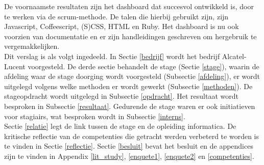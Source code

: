 \documentclass[10pt,a4paper]{article}
\begin{document}
De voornaamste resultaten zijn het dashboard dat succesvol ontwikkeld is, door te werken via de scrum-methode. De talen die hierbij gebruikt zijn, zijn Javascript, Coffeescript, (S)CSS, HTML en Ruby. Het dashboard is nu ook voorzien van documentatie en er zijn handleidingen geschreven om hergebruik te vergemakkelijken.\\

Dit verslag is als volgt ingedeeld. In Sectie \ref{bedrijf} wordt het bedrijf Alcatel-Lucent voorgesteld. De derde sectie behandelt de stage (Sectie \ref{stage}), waarin de afdeling waar de stage doorging wordt voorgesteld (Subsectie \ref{afdeling}), er wordt uitgelegd volgens welke methoden er wordt gewerkt (Subsectie \ref{methoden}). De stageopdracht wordt uitgelegd in Subsectie \ref{opdracht}. Het resultaat wordt besproken in Subsectie \ref{resultaat}. Gedurende de stage waren er ook initiatieven voor stagiairs, wat besproken wordt in Subsectie \ref{interns}.\\
Sectie \ref{relatie} legt de link tussen de stage en de opleiding informatica. De kritische reflectie van de competenties die getracht werden verbeterd te worden is te vinden in Sectie \ref{reflectie}. Sectie \ref{besluit} bevat het besluit en de appendices zijn te vinden in Appendix \ref{lit_study}, \ref{enquete1}, \ref{enquete2} en \ref{competenties}. 
\end{document}

